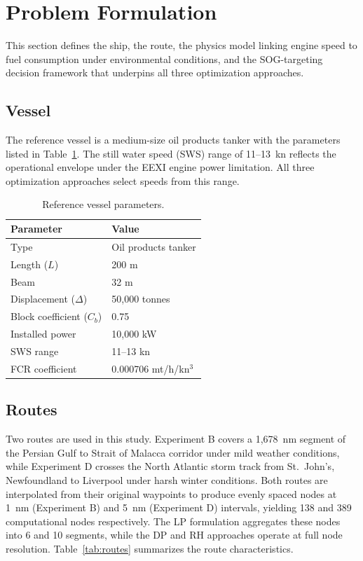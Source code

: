 \documentclass[review]{elsarticle}
\begin{document}
\section{Problem Formulation}
\label{sec:problem}

This section defines the ship, the route, the physics model linking engine speed to fuel consumption under environmental conditions, and the SOG-targeting decision framework that underpins all three optimization approaches.

\subsection{Vessel}
\label{sec:vessel}

The reference vessel is a medium-size oil products tanker with the parameters listed in Table~\ref{tab:ship}. The still water speed (SWS) range of 11--13~kn reflects the operational envelope under the EEXI engine power limitation. All three optimization approaches select speeds from this range.

\begin{table}[htbp]
\centering
\caption{Reference vessel parameters.}
\label{tab:ship}
\begin{tabular}{ll}
\toprule
Parameter & Value \\
\midrule
Type & Oil products tanker \\
Length ($L$) & 200 m \\
Beam & 32 m \\
Displacement ($\Delta$) & 50,000 tonnes \\
Block coefficient ($C_b$) & 0.75 \\
Installed power & 10,000 kW \\
SWS range & 11--13 kn \\
FCR coefficient & 0.000706 mt/h/kn$^3$ \\
\bottomrule
\end{tabular}
\end{table}

\subsection{Routes}
\label{sec:routes}

Two routes are used in this study. Experiment B covers a 1,678~nm segment of the Persian Gulf to Strait of Malacca corridor under mild weather conditions, while Experiment D crosses the North Atlantic storm track from St.\ John's, Newfoundland to Liverpool under harsh winter conditions. Both routes are interpolated from their original waypoints to produce evenly spaced nodes at 1~nm (Experiment B) and 5~nm (Experiment D) intervals, yielding 138 and 389 computational nodes respectively. The LP formulation aggregates these nodes into 6 and 10 segments, while the DP and RH approaches operate at full node resolution. Table~\ref{tab:routes} summarizes the route characteristics.
\end{document}

